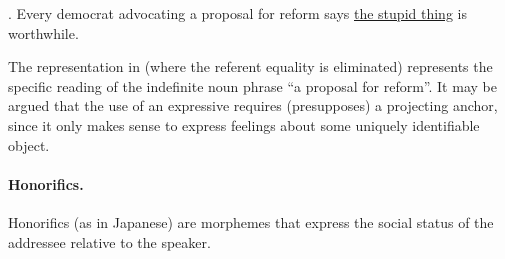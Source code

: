 \noindent\parbox[b]{\textwidth}{
\ex. Every democrat advocating a proposal for reform says 
  \underline{the stupid thing} is worthwhile.\\

}

\noindent 
The representation in \Last (where the referent equality is eliminated)
represents the specific reading of the indefinite noun phrase ``a proposal
for reform''. It may be argued that the use of an expressive requires
(presupposes) a projecting anchor, since it only makes sense to express
feelings about some uniquely identifiable object. 

\paragraph{Honorifics.} Honorifics (as in Japanese) are morphemes that
express the social status of the addressee relative to the speaker.

